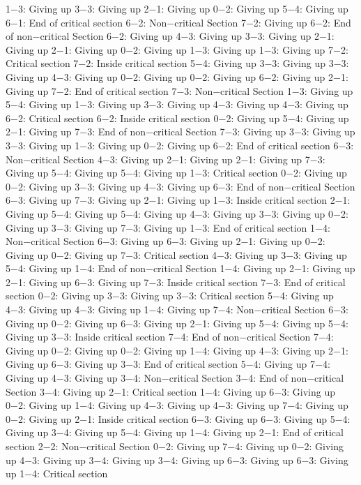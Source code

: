 1−3: Giving up
3−3: Giving up
2−1: Giving up
0−2: Giving up
5−4: Giving up
6−1: End of critical section
6−2: Non−critical Section
7−2: Giving up
6−2: End of non−critical Section
6−2: Giving up
4−3: Giving up
3−3: Giving up
2−1: Giving up
2−1: Giving up
0−2: Giving up
1−3: Giving up
1−3: Giving up
7−2: Critical section
7−2: Inside critical section
5−4: Giving up
3−3: Giving up
3−3: Giving up
4−3: Giving up
0−2: Giving up
0−2: Giving up
6−2: Giving up
2−1: Giving up
7−2: End of critical section
7−3: Non−critical Section
1−3: Giving up
5−4: Giving up
1−3: Giving up
3−3: Giving up
4−3: Giving up
4−3: Giving up
6−2: Critical section
6−2: Inside critical section
0−2: Giving up
5−4: Giving up
2−1: Giving up
7−3: End of non−critical Section
7−3: Giving up
3−3: Giving up
3−3: Giving up
1−3: Giving up
0−2: Giving up
6−2: End of critical section
6−3: Non−critical Section
4−3: Giving up
2−1: Giving up
2−1: Giving up
7−3: Giving up
5−4: Giving up
5−4: Giving up
1−3: Critical section
0−2: Giving up
0−2: Giving up
3−3: Giving up
4−3: Giving up
6−3: End of non−critical Section
6−3: Giving up
7−3: Giving up
2−1: Giving up
1−3: Inside critical section
2−1: Giving up
5−4: Giving up
5−4: Giving up
4−3: Giving up
3−3: Giving up
0−2: Giving up
3−3: Giving up
7−3: Giving up
1−3: End of critical section
1−4: Non−critical Section
6−3: Giving up
6−3: Giving up
2−1: Giving up
0−2: Giving up
0−2: Giving up
7−3: Critical section
4−3: Giving up
3−3: Giving up
5−4: Giving up
1−4: End of non−critical Section
1−4: Giving up
2−1: Giving up
2−1: Giving up
6−3: Giving up
7−3: Inside critical section
7−3: End of critical section
0−2: Giving up
3−3: Giving up
3−3: Critical section
5−4: Giving up
4−3: Giving up
4−3: Giving up
1−4: Giving up
7−4: Non−critical Section
6−3: Giving up
0−2: Giving up
6−3: Giving up
2−1: Giving up
5−4: Giving up
5−4: Giving up
3−3: Inside critical section
7−4: End of non−critical Section
7−4: Giving up
0−2: Giving up
0−2: Giving up
1−4: Giving up
4−3: Giving up
2−1: Giving up
6−3: Giving up
3−3: End of critical section
5−4: Giving up
7−4: Giving up
4−3: Giving up
3−4: Non−critical Section
3−4: End of non−critical Section
3−4: Giving up
2−1: Critical section
1−4: Giving up
6−3: Giving up
0−2: Giving up
1−4: Giving up
4−3: Giving up
4−3: Giving up
7−4: Giving up
0−2: Giving up
2−1: Inside critical section
6−3: Giving up
6−3: Giving up
5−4: Giving up
3−4: Giving up
5−4: Giving up
1−4: Giving up
2−1: End of critical section
2−2: Non−critical Section
0−2: Giving up
7−4: Giving up
0−2: Giving up
4−3: Giving up
3−4: Giving up
3−4: Giving up
6−3: Giving up
6−3: Giving up
1−4: Critical section
